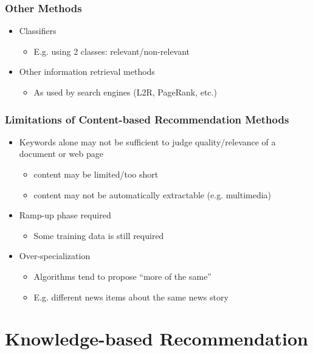 \documentclass{beamer}
\begin{document}
\begin{frame}
    \frametitle{Other Methods}
    \begin{itemize}
    \item Classifiers
        \begin{itemize}
        \item E.g. using 2 classes: relevant/non-relevant
        \end{itemize}
    \item Other information retrieval methods
        \begin{itemize}
        \item As used by search engines (L2R, PageRank, etc.)
        \end{itemize}
    \end{itemize}
\end{frame}

\begin{frame}
    \frametitle{Limitations of Content-based Recommendation Methods}
    \begin{itemize}
    \item Keywords alone may not be sufficient to judge quality/relevance of a
        document or web page
        \begin{itemize}
        \item content may be limited/too short
        \item content may not be automatically extractable (e.g. multimedia)
        \end{itemize}
    \item Ramp-up phase required
        \begin{itemize}
        \item Some training data is still required
        \end{itemize}
    \item Over-specialization
        \begin{itemize}
        \item Algorithms tend to propose ``more of the same''
        \item E.g. different news items about the same news story
        \end{itemize}
    \end{itemize}
\end{frame}

\section{Knowledge-based Recommendation}
\end{document}
